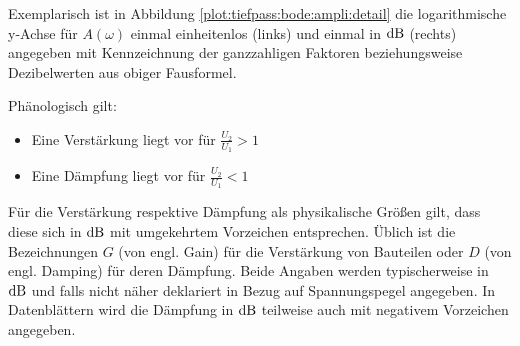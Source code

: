 \begin{frame}
{    Exemplarisch ist in Abbildung \ref{plot:tiefpass:bode:ampli:detail} die logarithmische y-Achse für $A(\omega)$ 
    einmal einheitenlos (links) und einmal in $\operatorname{dB}$ (rechts) angegeben mit Kennzeichnung der ganzzahligen Faktoren 
    beziehungsweise Dezibelwerten aus obiger Fausformel.
    
    Phänologisch gilt:
    \begin{itemize}
        \item Eine Verstärkung liegt vor für $\frac{U_2}{U_1}>1$
        \item Eine Dämpfung liegt vor für $\frac{U_2}{U_1}<1$
    \end{itemize}
    
    Für die Verstärkung respektive Dämpfung als physikalische Größen gilt, dass diese sich in $\operatorname{dB}$ mit umgekehrtem Vorzeichen entsprechen.
    Üblich ist die Bezeichnungen $G$ (von engl. Gain) für die Verstärkung von Bauteilen oder $D$ (von engl. Damping) für deren Dämpfung.
    Beide Angaben werden typischerweise in $\operatorname{dB}$ und falls nicht näher deklariert in Bezug auf Spannungspegel angegeben.
    In Datenblättern wird die Dämpfung in $\operatorname{dB}$ teilweise auch mit negativem Vorzeichen angegeben.
}

\end{frame}


